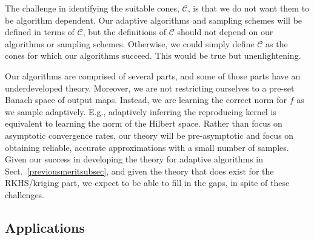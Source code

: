 \documentclass[11pt]{NSFamsart}
\newcommand{\POIs}{\hyperlink{POIlink}{POIs}\xspace}
\newcommand{\calc}{{\mathcal{C}}}
\begin{document}
The challenge in identifying the suitable cones, $\calc$, is that we do not want them to be algorithm dependent. Our adaptive algorithms and sampling schemes will be defined in terms of $\calc$, but the definitions of $\calc$ should not depend on our algorithms or sampling schemes. Otherwise, we could simply define $\calc$ as the cones for which our algorithms succeed. This would be true but unenlightening.

Our algorithms are comprised of several parts, and some of those parts have an underdeveloped theory. Moreover, we are not restricting ourselves to a pre-set Banach space of output maps. Instead, we are learning the correct norm for $f$ as we sample adaptively. E.g., adaptively inferring the reproducing kernel is equivalent to learning the norm of the Hilbert space. Rather than focus on asymptotic convergence rates, our theory will be pre-asymptotic and focus on obtaining reliable, accurate approximations with a small number of samples. Given our success in developing the theory for adaptive algorithms in Sect.\ \ref{previousmeritsubsec}, and given the theory that does exist for the RKHS/kriging part, we expect to be able to fill in the gaps, in spite of these challenges.


\subsection{Applications} \label{sec:Applications}

\end{document}

